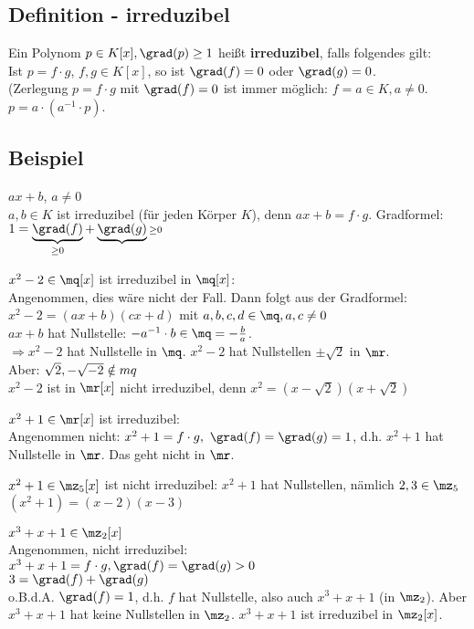 	\subsection{Definition - irreduzibel}
	
	Ein Polynom $p\in K[x],\grad(p)\geq 1$ heißt \textbf{irreduzibel}, falls folgendes gilt:\\
	Ist $p=f\cdot g$, $f,g\in K[x]$, so ist $\grad(f)=0$ oder $\grad(g)=0$.\\
	(Zerlegung $p=f\cdot g$ mit $\grad(f)=0$ ist immer möglich: $f=a\in K,a\neq 0$. $p=a\cdot(a^{-1}\cdot p)$.
	
	\subsection{Beispiel}
	
	\item $ax+b$, $a\neq 0$\\
	$a,b\in K$ ist irreduzibel (für jeden Körper $K$), denn $ax+b=f\cdot g$. Gradformel: $1=\underbrace{\grad(f)}_{\scriptstyle \geq 0}+\underbrace{\grad(g)}{\scriptstyle \geq 0}$
	\item $x^2-2\in\mq[x]$ ist irreduzibel in $\mq[x]$:\\
	Angenommen, dies wäre nicht der Fall. Dann folgt aus der Gradformel: $x^2-2=(ax+b)(cx+d)$ mit $a,b,c,d\in\mq,a,c\neq 0$\\
	$ax+b$ hat Nullstelle: $-a^{-1}\cdot b\in\mq=-\frac{b}{a}$.\\
	$\Rightarrow x^2-2$ hat Nullstelle in $\mq$. $x^2-2$ hat Nullstellen $\pm\sqrt{2}$ in $\mr$.\\
	Aber: $\sqrt{2},-\sqrt{-2}\notin\\mq$\\
	$x^2-2$ ist in $\mr[x]$ nicht irreduzibel, denn $x^2=(x-\sqrt{2})(x+\sqrt{2})$
	\item $x^2+1\in\mr[x]$ ist irreduzibel:\\
	Angenommen nicht: $x^2+1=f\cdot g,\ \grad(f)=\grad(g)=1$,
	d.h. $x^2+1$ hat Nullstelle in $\mr$. Das geht nicht in $\mr$.
	\item $x^2+1\in\mz_5[x]$ ist nicht irreduzibel: $x^2+1$ hat Nullstellen, nämlich $2,3\in\mz_5$ $(x^2+1)=(x-2)(x-3)$
	\item $x^3+x+1\in\mz_2[x]$\\
	Angenommen, nicht irreduzibel:\\
	$x^3+x+1=f\cdot g,\grad(f)=\grad(g)>0$\\
	$3=\grad(f)+\grad(g)$\\
	o.B.d.A. $\grad(f)=1$, d.h. $f$ hat Nullstelle, also auch $x^3+x+1$ (in $\mz_2$). Aber $x^3+x+1$ hat keine Nullstellen in $\mz_2$. $x^3+x+1$ ist irreduzibel in $\mz_2[x]$.
	\subExEnd
	
